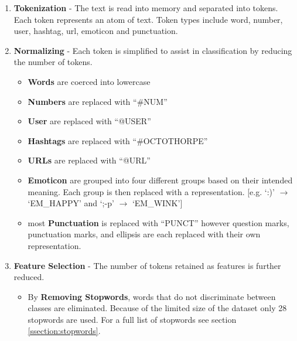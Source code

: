 \documentclass[final,3p,12pt]{elsarticle}
\begin{document}
\begin{enumerate}

    \item \textbf{Tokenization} - The text is read into memory and separated into
        tokens. Each token represents an atom of text. Token types include
        word, number, user, hashtag, url, emoticon and punctuation.

    \item \textbf{Normalizing} - Each token is simplified to assist in
        classification by reducing the number of tokens.

        \begin{itemize}

            \item \textbf{Words} are coerced into lowercase

            \item \textbf{Numbers} are replaced with ``\#NUM''

            \item \textbf{User} are replaced with ``@USER''

            \item \textbf{Hashtags} are replaced with ``\#OCTOTHORPE''

            \item \textbf{URLs} are replaced with ``@URL''

            \item \textbf{Emoticon} are grouped into four different groups
                based on their intended meaning. Each group is then replaced
                with a representation. [e.g. `:)' $\rightarrow$ `EM\_HAPPY' and
                `;-p' $\rightarrow$ `EM\_WINK']

            \item most \textbf{Punctuation} is replaced with ``PUNCT'' however
                question marks, punctuation marks, and ellipsis are each
                replaced with their own representation.

        \end{itemize}

    \item \textbf{Feature Selection} - The number of tokens retained as
        features is further reduced.
        \begin{itemize}

            \item By \textbf{Removing Stopwords}, words that do not
                discriminate between classes are eliminated. Because of the
                limited size of the dataset only 28 stopwords are used. For a
                full list of stopwords see section \ref{ssection:stopwords}.


\end{itemize}
\end{enumerate}
\end{document}
